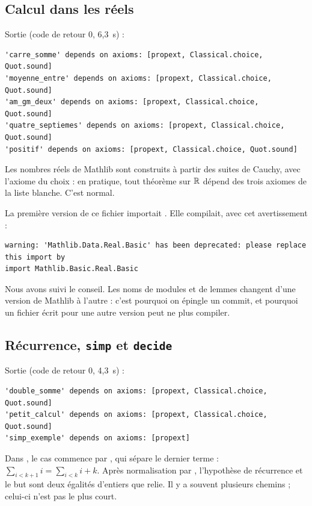 \subsection{Calcul dans les réels}

\noindent Sortie (code de retour $0$, 6,3~s) :
\begin{lstlisting}[style=appC,language={}]
'carre_somme' depends on axioms: [propext, Classical.choice, Quot.sound]
'moyenne_entre' depends on axioms: [propext, Classical.choice, Quot.sound]
'am_gm_deux' depends on axioms: [propext, Classical.choice, Quot.sound]
'quatre_septiemes' depends on axioms: [propext, Classical.choice, Quot.sound]
'positif' depends on axioms: [propext, Classical.choice, Quot.sound]
\end{lstlisting}
Les nombres réels de Mathlib sont construits à partir des suites de Cauchy, avec l'axiome du choix : en pratique, tout théorème sur
$\mathbb{R}$ dépend des trois axiomes de la liste blanche. C'est normal.

\begin{remark}
La première version de ce fichier importait . Elle compilait, avec cet avertissement :
\begin{lstlisting}[style=appC,language={}]
warning: 'Mathlib.Data.Real.Basic' has been deprecated: please replace this import by
import Mathlib.Basic.Real.Basic
\end{lstlisting}
Nous avons suivi le conseil. Les noms de modules et de lemmes changent d'une version de Mathlib à l'autre : c'est
pourquoi on épingle un commit, et pourquoi un fichier écrit pour une autre version peut ne plus compiler.
\end{remark}

\subsection{Récurrence, \texttt{simp} et \texttt{decide}}

\noindent Sortie (code de retour $0$, 4,3~s) :
\begin{lstlisting}[style=appC,language={}]
'double_somme' depends on axioms: [propext, Classical.choice, Quot.sound]
'petit_calcul' depends on axioms: [propext, Classical.choice, Quot.sound]
'simp_exemple' depends on axioms: [propext]
\end{lstlisting}
Dans , le cas  commence par , qui sépare le dernier terme :
$\sum_{i<k+1}i=\sum_{i<k}i+k$. Après normalisation par , l'hypothèse de récurrence  et le but sont
deux égalités d'entiers que  relie. Il y a souvent plusieurs chemins ; celui-ci n'est pas le plus court.


